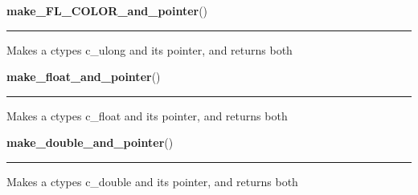     \label{xformslib:library:make_ulong_and_pointer}

    \vspace{0.5ex}

\hspace{.8\funcindent}\begin{boxedminipage}{\funcwidth}

    \raggedright \textbf{make\_FL\_COLOR\_and\_pointer}()

    \vspace{-1.5ex}

    \rule{\textwidth}{0.5\fboxrule}
\setlength{\parskip}{2ex}
    Makes a ctypes c\_ulong and its pointer, and returns both

\setlength{\parskip}{1ex}
    \end{boxedminipage}

    \label{xformslib:library:make_float_and_pointer}

    \vspace{0.5ex}

\hspace{.8\funcindent}\begin{boxedminipage}{\funcwidth}

    \raggedright \textbf{make\_float\_and\_pointer}()

    \vspace{-1.5ex}

    \rule{\textwidth}{0.5\fboxrule}
\setlength{\parskip}{2ex}
    Makes a ctypes c\_float and its pointer, and returns both

\setlength{\parskip}{1ex}
    \end{boxedminipage}

    \label{xformslib:library:make_double_and_pointer}

    \vspace{0.5ex}

\hspace{.8\funcindent}\begin{boxedminipage}{\funcwidth}

    \raggedright \textbf{make\_double\_and\_pointer}()

    \vspace{-1.5ex}

    \rule{\textwidth}{0.5\fboxrule}
\setlength{\parskip}{2ex}
    Makes a ctypes c\_double and its pointer, and returns both

\setlength{\parskip}{1ex}
    \end{boxedminipage}

